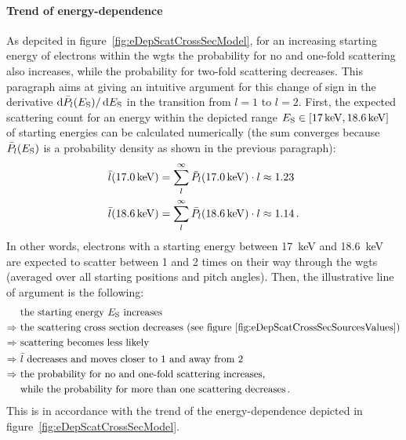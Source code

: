 \paragraph{Trend of energy-dependence}
As depcited in figure~\ref{fig:eDepScatCrossSecModel}, for an increasing starting energy of electrons within the \gls{wgts} the probability for no and one-fold scattering also increases, while the probability for two-fold scattering decreases. This paragraph aims at giving an intuitive argument for this change of sign in the derivative $\mathop{}\!\mathrm{d} \bar{P}_l(E_\mathrm{S}) / \mathop{}\!\mathrm{d} E_\mathrm{S}$ in the transition from $l=1$ to $l=2$. First, the expected scattering count for an energy within the depicted range $E_\mathrm{S} \in [\SI{17}{keV}, \SI{18.6}{keV}]$ of starting energies can be calculated numerically (the sum converges because $\bar{P}_l(E_\mathrm{S})$ is a probability density as shown in the previous paragraph):
\begin{align}
	\bar{l}(\SI{17.0}{keV}) &= 
	\sum_{l}^{\infty} \bar{P}_l(\SI{17.0}{keV}) \cdot l \approx 1.23 \\	
	\bar{l}(\SI{18.6}{keV}) &= 
	\sum_{l}^{\infty} \bar{P}_l(\SI{18.6}{keV}) \cdot l \approx 1.14
	\text{\,.}
\end{align} 
In other words, electrons with a starting energy between \SI{17}{keV} and \SI{18.6}{keV} are expected to scatter between 1 and 2 times on their way through the \gls{wgts} (averaged over all starting positions and pitch angles). Then, the illustrative line of argument is the following: 
\begin{align*}
	&\text{ the starting energy $E_\mathrm{S}$ increases} \\ \Rightarrow
	&\text{ the scattering cross section decreases (see figure~\ref{fig:eDepScatCrossSecSourcesValues})} \\ \Rightarrow
	&\text{ scattering becomes less likely} \\ \Rightarrow
	&\text{ $\bar{l}$ decreases and moves closer to 1 and away from 2} \\ \Rightarrow
	&\text{ the probability for no and one-fold scattering increases,} \\
	&\text{ while the probability for more than one scattering decreases}
	\text{\,.}
\end{align*} 
This is in accordance with the trend of the energy-dependence depicted in figure~\ref{fig:eDepScatCrossSecModel}.
\FloatBarrier

